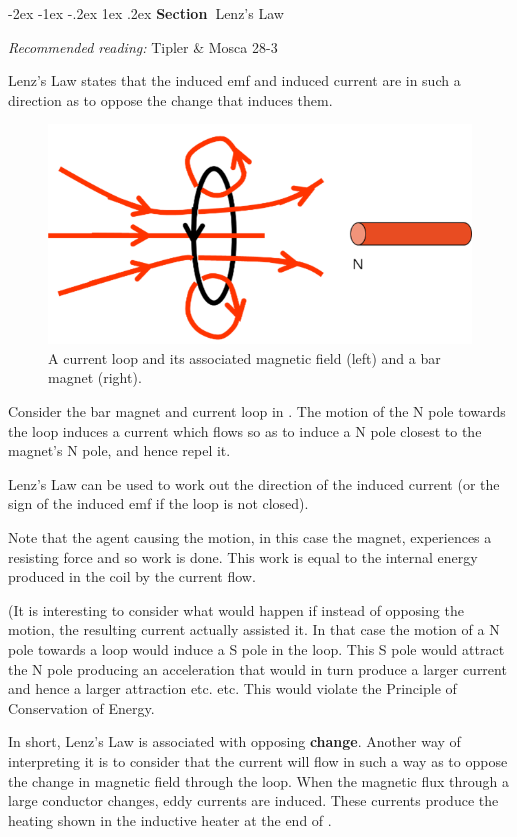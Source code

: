 \documentclass[
]{book}
\makeatletter
\renewcommand\section{%
\@startsection{section}{1}{\z@}%
              {-2ex \@plus -1ex \@minus -.2ex}%
              {1ex \@plus .2ex}%
              {\sffamily\bfseries\large\noindent Section~}}
\numberwithin{equation}{section}
\makeatother
\begin{document}
\hypertarget{lenzs-law}{%
\section{Lenz's Law}\label{lenzs-law}}

\emph{Recommended reading:} Tipler \& Mosca 28-3

Lenz's Law states that the induced emf and induced current are in such a
direction as to oppose the change that induces them.

\begin{figure}

{\centering \includegraphics[width=0.7\linewidth]{Figures/movingMag} 

}

\caption{A current loop and its associated magnetic field (left) and a bar magnet (right).}\label{fig:movingMag}
\end{figure}

Consider the bar magnet and current loop in . The motion of the N pole
towards the loop induces a current which flows so as to induce a N pole
closest to the magnet's N pole, and hence repel it.

Lenz's Law can be used to work out the direction of the induced current
(or the sign of the induced emf if the loop is not closed).

Note that the agent causing the motion, in this case the magnet,
experiences a resisting force and so work is done. This work is equal to
the internal energy produced in the coil by the current flow.

(It is interesting to consider what would happen if instead of opposing
the motion, the resulting current actually assisted it. In that case the
motion of a N pole towards a loop would induce a S pole in the loop.
This S pole would attract the N pole producing an acceleration that
would in turn produce a larger current and hence a larger attraction
etc. etc. This would violate the Principle of Conservation of Energy.

In short, Lenz's Law is associated with opposing \textbf{change}. Another way
of interpreting it is to consider that the current will flow in such a
way as to oppose the change in magnetic field through the loop. When the
magnetic flux through a large conductor changes, eddy currents are
induced. These currents produce the heating shown in the inductive
heater at the end of .
\end{document}
